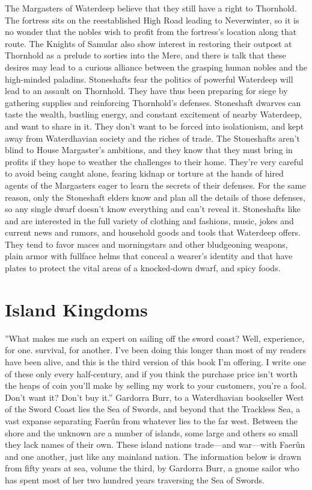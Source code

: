 \documentclass[10pt,a4paper,twoside,twocolumn,openany,bg=print,nodeprecatedcode]{dndbook}
\begin{document}
The Margasters of Waterdeep believe that they still have a right to Thornhold. The fortress sits on the reestablished High Road leading to Neverwinter, so it is no wonder that the nobles wish to profit from the fortress's location along that route. The Knights of Samular also show interest in restoring their outpost at Thornhold as a prelude to sorties into the Mere, and there is talk that these desires may lead to a curious alliance between the grasping human nobles and the high-minded paladins.
Stoneshafts fear the politics of powerful Waterdeep will lead to an assault on Thornhold. They have thus been preparing for siege by gathering supplies and reinforcing Thornhold's defenses.
Stoneshaft dwarves can taste the wealth, bustling energy, and constant excitement of nearby Waterdeep, and want to share in it. They don't want to be forced into isolationism, and kept away from Waterdhavian society and the riches of trade. The Stoneshafts aren't blind to House Margaster's ambitions, and they know that they must bring in profits if they hope to weather the challenges to their home. They're very careful to avoid being caught alone, fearing kidnap or torture at the hands of hired agents of the Margasters eager to learn the secrets of their defenses. For the same reason, only the Stoneshaft elders know and plan all the details of those defenses, so any single dwarf doesn't know everything and can't reveal it.
Stoneshafts like and are interested in the full variety of clothing and fashions, music, jokes and current news and rumors, and household goods and tools that Waterdeep offers. They tend to favor maces and morningstars and other bludgeoning weapons, plain armor with fullface helms that conceal a wearer's identity and that have plates to protect the vital areas of a knocked-down dwarf, and spicy foods.
\section{Island Kingdoms}
\DndQuote%
{}
{''What makes me such an expert on sailing off the sword coast? Well, experience, for one. survival, for another. I've been doing this longer than most of my readers have been alive, and this is the third version of this book I'm offering. I write one of these only every half-century, and if you think the purchase price isn't worth the heaps of coin you'll make by selling my work to your customers, you're a fool. Don't want it? Don't buy it.''}
{Gardorra Burr, to a Waterdhavian bookseller}
West of the Sword Coast lies the Sea of Swords, and beyond that the Trackless Sea, a vast expanse separating Faerûn from whatever lies to the far west. Between the shore and the unknown are a number of islands, some large and others so small they lack names of their own. These island nations trade—and war—with Faerûn and one another, just like any mainland nation.
The information below is drawn from fifty years at sea, volume the third, by Gardorra Burr, a gnome sailor who has spent most of her two hundred years traversing the Sea of Swords.
\end{document}
